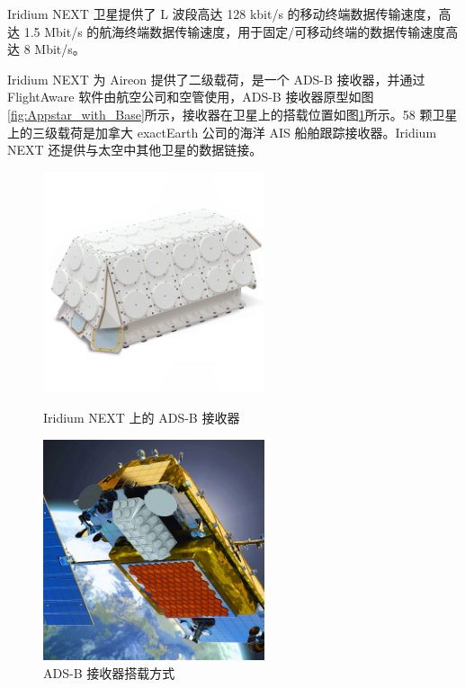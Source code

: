 \begin{enumerate}
    Iridium NEXT 卫星提供了 L 波段高达 128 kbit/s 的移动终端数据传输速度，高达 1.5 Mbit/s 的航海终端数据传输速度，用于固定/可移动终端的数据传输速度高达 8 Mbit/s。

    Iridium NEXT 为 Aireon 提供了二级载荷，是一个 ADS-B 接收器，并通过 FlightAware 软件由航空公司和空管使用，ADS-B 接收器原型如图\ref{fig:Appstar_with_Base}所示，接收器在卫星上的搭载位置如图\ref{fig:reconfigurable_multimission_payloads}所示。58 颗卫星上的三级载荷是加拿大 exactEarth 公司的海洋 AIS 船舶跟踪接收器。Iridium NEXT 还提供与太空中其他卫星的数据链接。

    \begin{figure}[htbp]
    \centering
    \begin{minipage}[t]{0.48\textwidth}
    \centering
    \includegraphics[width=6.5cm]{pic/Appstar_with_Base_2000x2000.jpg}
    \caption{Iridium NEXT 上的 ADS-B 接收器}
    \label{fig:Appstar_with_Base}
    \end{minipage}
    \begin{minipage}[t]{0.48\textwidth}
    \centering
    \includegraphics[width=6.5cm]{pic/reconfigurable_multimission_payloads_v2_web.jpg}
    \caption{ADS-B 接收器搭载方式}
    \label{fig:reconfigurable_multimission_payloads}
    \end{minipage}
    \end{figure}

\end{enumerate}

